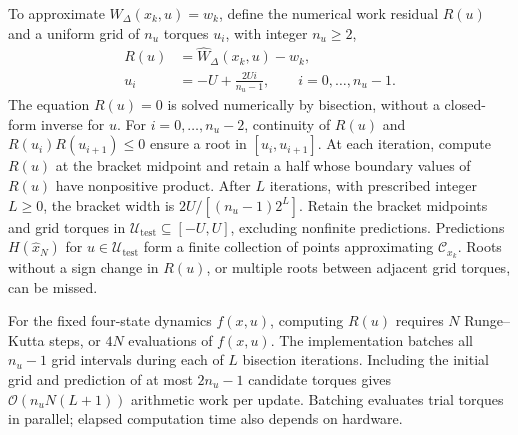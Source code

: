 \documentclass[letterpaper,10pt,conference]{ieeeconf}
\begin{document}
To approximate $W_\Delta(x_k,u)=w_k$, define the numerical work residual $R(u)$ and a uniform grid of $n_u$ torques $u_i$, with integer $n_u\ge2$,
\begin{equation}
\begin{aligned}
 R(u)&=\widehat W_\Delta(x_k,u)-w_k,\\
 u_i&=-U+\frac{2Ui}{n_u-1},\qquad i=0,\ldots,n_u-1.
\end{aligned}
\label{eq:torque-search}
\end{equation}
The equation $R(u)=0$ is solved numerically by bisection, without a closed-form inverse for $u$. For $i=0,\ldots,n_u-2$, continuity of $R(u)$ and $R(u_i)R(u_{i+1})\le0$ ensure a root in $[u_i,u_{i+1}]$. At each iteration, compute $R(u)$ at the bracket midpoint and retain a half whose boundary values of $R(u)$ have nonpositive product. After $L$ iterations, with prescribed integer $L\ge0$, the bracket width is $2U/[(n_u-1)2^L]$. Retain the bracket midpoints and grid torques in $\mathcal U_{\mathrm{test}}\subseteq[-U,U]$, excluding nonfinite predictions. Predictions $H(\widehat x_N)$ for $u\in\mathcal U_{\mathrm{test}}$ form a finite collection of points approximating $\mathcal C_{x_k}$. Roots without a sign change in $R(u)$, or multiple roots between adjacent grid torques, can be missed.

For the fixed four-state dynamics $f(x,u)$, computing $R(u)$ requires $N$ Runge--Kutta steps, or $4N$ evaluations of $f(x,u)$. The implementation batches all $n_u-1$ grid intervals during each of $L$ bisection iterations. Including the initial grid and prediction of at most $2n_u-1$ candidate torques gives $\mathcal O(n_uN(L+1))$ arithmetic work per update. Batching evaluates trial torques in parallel; elapsed computation time also depends on hardware.
\end{document}
